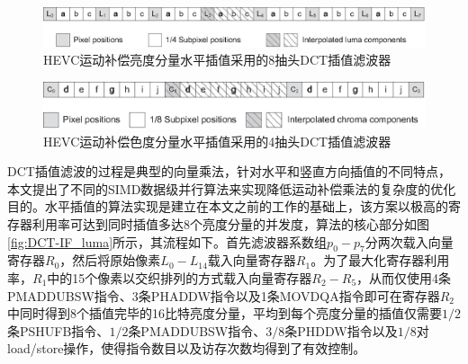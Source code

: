 \begin{figure}[!tp]
	\centering
	\includegraphics[width = 0.95\linewidth]{eps/luma_position}
	\caption{\label{fig:luma_position}
		HEVC运动补偿亮度分量水平插值采用的8抽头DCT插值滤波器}
\end{figure}

\begin{figure}[!tp]
	\centering
	\includegraphics[width = 0.95\linewidth]{eps/chroma_position}
	\caption{\label{fig:chroma_position}
		HEVC运动补偿色度分量水平插值采用的4抽头DCT插值滤波器}
\end{figure}

DCT插值滤波的过程是典型的向量乘法，针对水平和竖直方向插值的不同特点，本文提出了不同的SIMD数据级并行算法来实现降低运动补偿乘法的复杂度的优化目的。水平插值的算法实现是建立在本文之前的工作的基础上，该方案以极高的寄存器利用率可达到同时插值多达8个亮度分量的并发度，算法的核心部分如图\ref{fig:DCT-IF_luma}所示，其流程如下。首先滤波器系数组$p_0 - p_7$分两次载入向量寄存器$R_0$，然后将原始像素$L_0 - L_{14}$载入向量寄存器$R_1$。为了最大化寄存器利用率，$R_1$中的15个像素以交织排列的方式载入向量寄存器$R_2 - R_5$，从而仅使用4条PMADDUBSW指令、3条PHADDW指令以及1条MOVDQA指令即可在寄存器$R_2$中同时得到8个插值完毕的16比特亮度分量，平均到每个亮度分量的插值仅需要$1/2$条PSHUFB指令、$1/2$条PMADDUBSW指令、$3/8$条PHDDW指令以及$1/8$对load/store操作，使得指令数目以及访存次数均得到了有效控制。


